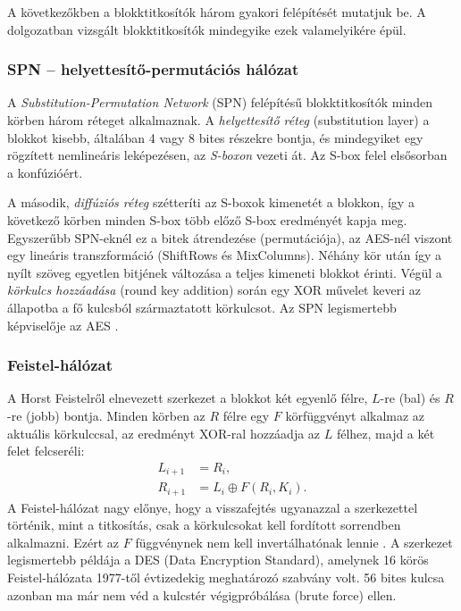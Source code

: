 \documentclass[a4paper,12pt]{report}
\theoremstyle{definition}
\theoremstyle{remark}
\begin{document}
A következőkben a blokktitkosítók három gyakori felépítését mutatjuk be. A dolgozatban vizsgált blokktitkosítók mindegyike ezek valamelyikére épül.

\subsubsection{SPN -- helyettesítő-permutációs hálózat}

A \emph{Substitution-Permutation Network} (SPN) felépítésű blokktitkosítók minden körben három réteget alkalmaznak. A \emph{helyettesítő réteg} (substitution layer) a blokkot kisebb, általában 4 vagy 8 bites részekre bontja, és mindegyiket egy rögzített nemlineáris leképezésen, az \emph{S-boxon} vezeti át. Az S-box felel elsősorban a konfúzióért.

A második, \emph{diffúziós réteg} szétteríti az S-boxok kimenetét a blokkon, így a következő körben minden S-box több előző S-box eredményét kapja meg. Egyszerűbb SPN-eknél ez a bitek átrendezése (permutációja), az AES-nél viszont egy lineáris transzformáció (ShiftRows és MixColumns). Néhány kör után így a nyílt szöveg egyetlen bitjének változása a teljes kimeneti blokkot érinti. Végül a \emph{körkulcs hozzáadása} (round key addition) során egy XOR művelet keveri az állapotba a fő kulcsból származtatott körkulcsot. Az SPN legismertebb képviselője az AES \cite{DaemenRijmen2002}.

\subsubsection{Feistel-hálózat}

A Horst Feistelről elnevezett szerkezet a blokkot két egyenlő félre, $L$-re (bal) és $R$-re (jobb) bontja. Minden körben az $R$ félre egy $F$ körfüggvényt alkalmaz az aktuális körkulccsal, az eredményt XOR-ral hozzáadja az $L$ félhez, majd a két felet felcseréli:
\begin{align}
	L_{i+1} &= R_i, \nonumber\\
	R_{i+1} &= L_i \oplus F(R_i, K_i).
\end{align}
A Feistel-hálózat nagy előnye, hogy a visszafejtés ugyanazzal a szerkezettel történik, mint a titkosítás, csak a körkulcsokat kell fordított sorrendben alkalmazni. Ezért az $F$ függvénynek nem kell invertálhatónak lennie \cite{Paar2010}. A szerkezet legismertebb példája a DES (Data Encryption Standard), amelynek 16 körös Feistel-hálózata 1977-től évtizedekig meghatározó szabvány volt. 56 bites kulcsa azonban ma már nem véd a kulcstér végigpróbálása (brute force) ellen.
\end{document}
